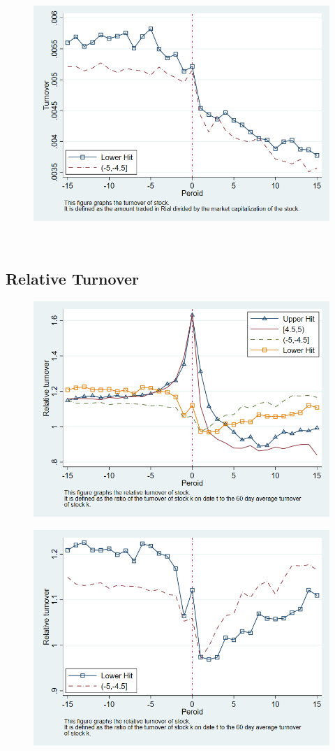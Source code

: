 \documentclass[12pt]{article}
\begin{document}
\begin{figure}[htbp]
\centering
\includegraphics[width=0.7\linewidth]{CLT}
\caption{}
\label{fig:clt}
\end{figure}

\FloatBarrier

‌ %
‌ %
\subsection{Relative Turnover}
\begin{figure}[htbp]
\centering
\includegraphics[width=0.7\linewidth]{TRT}
\caption{}
\label{fig:trt}
\end{figure}

\begin{figure}[htbp]
\centering
\includegraphics[width=0.7\linewidth]{CLRT}
\caption{}
\label{fig:clrt}
\end{figure}
\end{document}
